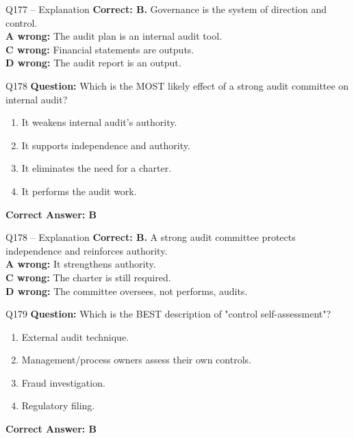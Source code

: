 \documentclass[aspectratio=169,10pt]{beamer}
\begin{document}
	\begin{frame}[t]{Q177 -- Explanation}
		\small
		\textbf{Correct: B.} Governance is the system of direction and control. \\[4pt]
		\textbf{A wrong:} The audit plan is an internal audit tool. \\[2pt]
		\textbf{C wrong:} Financial statements are outputs. \\[2pt]
		\textbf{D wrong:} The audit report is an output.
	\end{frame}
	
	\begin{frame}[t]{Q178}
		\small
		\textbf{Question:} Which is the MOST likely effect of a strong audit committee on internal audit?
		\begin{enumerate}[label=\Alph*.,itemsep=1pt,topsep=2pt]
			\item It weakens internal audit's authority.
			\item It supports independence and authority.
			\item It eliminates the need for a charter.
			\item It performs the audit work.
		\end{enumerate}
		\vspace{4pt}
		\textbf{Correct Answer: B}
	\end{frame}
	
	\begin{frame}[t]{Q178 -- Explanation}
		\small
		\textbf{Correct: B.} A strong audit committee protects independence and reinforces authority. \\[4pt]
		\textbf{A wrong:} It strengthens authority. \\[2pt]
		\textbf{C wrong:} The charter is still required. \\[2pt]
		\textbf{D wrong:} The committee oversees, not performs, audits.
	\end{frame}
	
	\begin{frame}[t]{Q179}
		\small
		\textbf{Question:} Which is the BEST description of "control self-assessment"?
		\begin{enumerate}[label=\Alph*.,itemsep=1pt,topsep=2pt]
			\item External audit technique.
			\item Management/process owners assess their own controls.
			\item Fraud investigation.
			\item Regulatory filing.
		\end{enumerate}
		\vspace{4pt}
		\textbf{Correct Answer: B}
	\end{frame}
	
\end{document}
